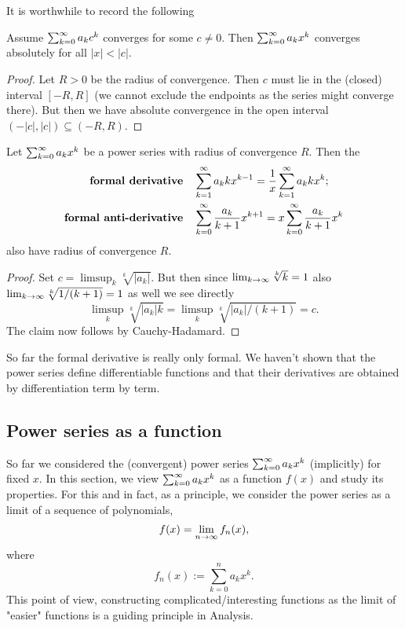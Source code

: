 \documentclass[10pt, a4paper]{article}
\begin{document}
It is worthwhile to record the following
\begin{corollary}
    Assume $\infsumo a_kc ^ k$ converges for some $c \neq 0$.
    Then $\infsumo a_kx ^ k$ converges absolutely for all $|x| < |c|$.
    \begin{proof}
        Let $R > 0$ be the radius of convergence.
        Then $c$ must lie in the
        (closed)
        interval $[-R, R]$
        (we cannot exclude the endpoints as the series might converge there).
        But then we have absolute convergence in the open interval $(-|c|, |c|) \subseteq (-R, R)$.
    \end{proof}
\end{corollary}

\begin{lemma}\label{pre:analy:lem:powseriescalc}
    Let $\infsumo a_kx ^ k$ be a power series with radius of convergence $R$.
    Then the
    \begin{align*}
        \textbf{formal derivative}\quad&\infsum a_kkx ^ {k - 1} = \frac{1}{x}\infsum a_kk x ^ {k}; \\
        \textbf{formal anti-derivative}\quad&\infsumo\frac{a_k}{k + 1}x ^ {k + 1} = x\infsumo\frac{a_k}{k + 1}x ^ {k}
    \end{align*}
    also have radius of convergence $R$.
    \begin{proof}
        Set $c = \limsup_{k}\sqrt[k]{|a_k|}$.
        But then since $\liminfty[k]\sqrt[k]{k} = 1$ also $\liminfty[k]\sqrt[k]{1 / (k + 1)} = 1$ as well we see directly
        \[
        \limsup_{k}\sqrt[k]{|a_k|k} = \limsup_{k}\sqrt[k]{|a_k| / (k + 1)} = c.
        \]
        The claim now follows by Cauchy-Hadamard.
    \end{proof}
\end{lemma}

\begin{remark}
    So far the formal derivative is really only formal.
    We haven't shown that the power series define differentiable functions and that their derivatives are obtained by differentiation term by term.
\end{remark}

\subsection{Power series as a function}

So far we considered the
(convergent)
power series $\infsumo a_kx ^ k$
(implicitly)
for fixed $x$.
In this section,
we view $\infsumo a_kx ^ k$ as a function $f(x)$ and study its properties.
For this and in fact,
as a principle,
we consider the power series as a limit of a sequence of polynomials,
\[
f(x) = \liminfty f_n(x),
\]
where
\[
f_n(x) := \sum_{k = 0}^{n}a_kx ^ k.
\]
This point of view,
constructing complicated/interesting functions as the limit of "easier" functions is a guiding principle in Analysis.
\end{document}
